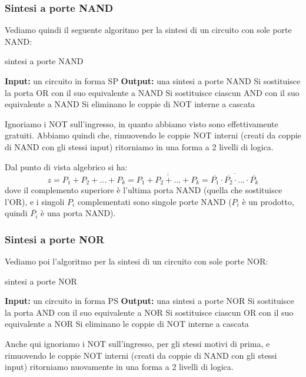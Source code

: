 \documentclass[a4paper,11pt]{article}
\begin{document}
\subsubsection{Sintesi a porte NAND}
Vediamo quindi il seguente algoritmo per la sintesi di un circuito con sole porte NAND:
\begin{algorithm}
\caption{sintesi a porte NAND}
\begin{algorithmic}
	\STATE \textbf{Input:} un circuito in forma SP 
	\STATE \textbf{Output:} una sintesi a porte NAND
	\STATE Si sostituisce la porta OR con il suo equivalente a NAND
	\STATE Si sostituisce ciascun AND con il suo equivalente a NAND
	\STATE Si eliminano le coppie di NOT interne a cascata
\end{algorithmic}
\end{algorithm}

Ignoriamo i NOT sull'ingresso, in quanto abbiamo visto sono effettivamente gratuiti.
Abbiamo quindi che, rimuovendo le coppie NOT interni (creati da coppie di NAND con gli stessi input) ritorniamo in una forma a 2 livelli di logica.

Dal punto di vista algebrico si ha:
$$
z = P_1 + P_2 + ... + P_k = \overline{\overline{ P_1 + P_2 + ... + P_k }} = \overline{ \overline{P_1} \cdot \overline{P_2} \cdot ... \cdot \overline{P_k}}
$$
dove il complemento superiore è l'ultima porta NAND (quella che sostituisce l'OR), e i singoli $P_i$ complementati sono singole porte NAND ($P_i$ è un prodotto, quindi $\overline{P_i}$ è una porta NAND).

\subsubsection{Sintesi a porte NOR}
Vediamo poi l'algoritmo per la sintesi di un circuito con sole porte NOR:
\begin{algorithm}
\caption{sintesi a porte NOR}
\begin{algorithmic}
	\STATE \textbf{Input:} un circuito in forma PS 
	\STATE \textbf{Output:} una sintesi a porte NOR
	\STATE Si sostituisce la porta AND con il suo equivalente a NOR
	\STATE Si sostituisce ciascun OR con il suo equivalente a NOR
	\STATE Si eliminano le coppie di NOT interne a cascata
\end{algorithmic}
\end{algorithm}

Anche qui ignoriamo i NOT sull'ingresso, per gli stessi motivi di prima, e rimuovendo le coppie NOT interni (creati da coppie di NAND con gli stessi input) ritorniamo nuovamente in una forma a 2 livelli di logica.
\end{document}
